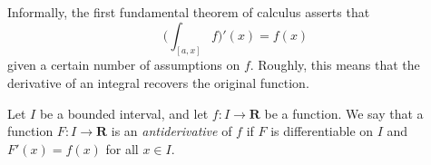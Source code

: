 \begin{note}
    Informally, the first fundamental theorem of calculus asserts that
    \[
        \bigg(\int_{[a, x]} f\bigg)'(x) = f(x)
    \]
    given a certain number of assumptions on \(f\).
    Roughly, this means that the derivative of an integral recovers the original function.
\end{note}

\setcounter{theorem}{2}
\begin{definition}[Antiderivatives]\label{11.9.3}
    Let \(I\) be a bounded interval, and let \(f : I \to \mathbf{R}\) be a function.
    We say that a function \(F : I \to \mathbf{R}\) is an \emph{antiderivative} of \(f\) if \(F\) is differentiable on \(I\) and \(F'(x) = f(x)\) for all \(x \in I\).
\end{definition}